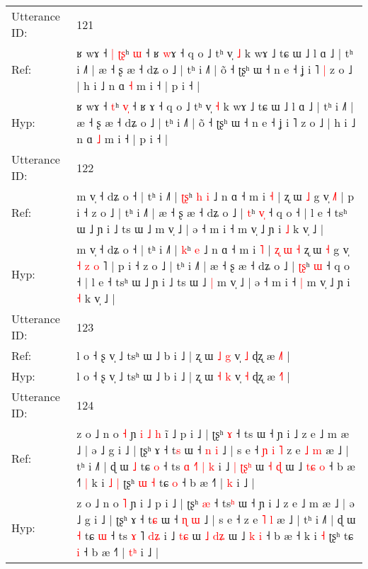\documentclass[10pt]{article}
\DeclareRobustCommand{\hl}[1]{{\textcolor{red}{#1}}}
\begin{document}
\begin{longtable}{ll}
 \\
\midrule
Utterance ID: & 121 \\
Ref: & ʁ wɤ ˧\hl{ }\hl{|} \hl{ʈ}\hl{ʂ}ʰ \hl{}\hl{ɯ} ˧ ʁ \hl{w}ɤ ˧ q o ˩ tʰ v̩ \hl{˩} k wɤ ˩ tɕ ɯ ˩ l ɑ ˩ | tʰ i ˩˥ | æ ˧ ʂ æ ˧ dʑ o ˩ | tʰ i ˩˥ | õ ˧ ʈʂʰ ɯ ˧ n e ˧ ʝ i ˥\hl{ }\hl{|} z o ˩ | h i ˩ n ɑ \hl{˧} m i ˧ | p i ˧ |
 \\
Hyp: & ʁ wɤ ˧\hl{}\hl{} \hl{}\hl{t}ʰ \hl{v}\hl{̩} ˧ ʁ \hl{}ɤ ˧ q o ˩ tʰ v̩ \hl{˧} k wɤ ˩ tɕ ɯ ˩ l ɑ ˩ | tʰ i ˩˥ | æ ˧ ʂ æ ˧ dʑ o ˩ | tʰ i ˩˥ | õ ˧ ʈʂʰ ɯ ˧ n e ˧ ʝ i ˥\hl{}\hl{} z o ˩ | h i ˩ n ɑ \hl{˩} m i ˧ | p i ˧ |
 \\
\midrule
Utterance ID: & 122 \\
Ref: & m v̩ ˧ dʑ o ˧ | tʰ i ˩˥ | \hl{ʈ}\hl{ʂ}ʰ\hl{ }\hl{h} \hl{i} ˩ n ɑ ˧ m i \hl{˧} |\hl{}\hl{}\hl{}\hl{}\hl{}\hl{} ʐ ɯ \hl{˩} g v̩\hl{}\hl{}\hl{}\hl{} \hl{}\hl{˩}˥ | p i ˧ z o ˩ | tʰ i ˩˥ | æ ˧ ʂ æ ˧ dʑ o ˩ | \hl{}\hl{t}ʰ \hl{v}\hl{̩} ˧ q o ˧ | l e ˧ tsʰ ɯ ˩ ɲ i ˩ ts ɯ ˩\hl{}\hl{} m v̩ ˩ | ə ˧ m i ˧\hl{}\hl{} m v̩ ˩ ɲ i \hl{˩} k v̩ ˩ |
 \\
Hyp: & m v̩ ˧ dʑ o ˧ | tʰ i ˩˥ | \hl{}\hl{k}ʰ\hl{}\hl{} \hl{e} ˩ n ɑ ˧ m i \hl{˥} |\hl{ }\hl{ʐ}\hl{ }\hl{ɯ}\hl{ }\hl{˧} ʐ ɯ \hl{˧} g v̩\hl{ }\hl{˧}\hl{ }\hl{z} \hl{o}\hl{ }˥ | p i ˧ z o ˩ | tʰ i ˩˥ | æ ˧ ʂ æ ˧ dʑ o ˩ | \hl{ʈ}\hl{ʂ}ʰ \hl{}\hl{ɯ} ˧ q o ˧ | l e ˧ tsʰ ɯ ˩ ɲ i ˩ ts ɯ ˩\hl{ }\hl{|} m v̩ ˩ | ə ˧ m i ˧\hl{ }\hl{|} m v̩ ˩ ɲ i \hl{˧} k v̩ ˩ |
 \\
\midrule
Utterance ID: & 123 \\
Ref: & l o ˧ ʂ v̩ ˩ tsʰ ɯ ˩ b i ˩ | ʐ ɯ \hl{˩} \hl{g} v̩ \hl{˩} ɖʐ æ \hl{˩}˥ |
 \\
Hyp: & l o ˧ ʂ v̩ ˩ tsʰ ɯ ˩ b i ˩ | ʐ ɯ \hl{˧} \hl{k} v̩ \hl{˧} ɖʐ æ \hl{˧}˥ |
 \\
\midrule
Utterance ID: & 124 \\
Ref: & z o ˩ n o \hl{˧} ɲ\hl{ }\hl{i}\hl{ }\hl{˩}\hl{ }\hl{h} i\hl{̃} ˩ p i ˩ | ʈʂʰ \hl{ɤ} ˧ ts\hl{} ɯ ˧ ɲ i ˩ z e ˩ m æ ˩ | ə ˩ g i ˩ | ʈʂʰ ɤ ˧ t\hl{s} ɯ ˧ \hl{n} \hl{i} ˩ | s e ˧\hl{ }\hl{ɲ}\hl{ }\hl{i}\hl{ }\hl{˥} z e \hl{˩} \hl{m} æ ˩ | tʰ i ˩˥ | ɖ ɯ \hl{˩} tɕ \hl{o} ˧ ts \hl{ɑ} \hl{˧}˥ \hl{|}\hl{ }\hl{k} i ˩\hl{ }\hl{|} \hl{ʈ}\hl{ʂ}\hl{ʰ} ɯ \hl{˧} \hl{}\hl{ɖ} ɯ ˩ \hl{t}\hl{ɕ} \hl{o} ˧ b æ ˧\hl{˥}\hl{ }\hl{|} k i\hl{ }\hl{˩} \hl{|} ʈʂʰ\hl{ }\hl{ɯ}\hl{ }\hl{˧} tɕ \hl{o} ˧ b æ ˧˥ | \hl{}\hl{k} i ˩ |
 \\
Hyp: & z o ˩ n o \hl{˥} ɲ\hl{}\hl{}\hl{}\hl{}\hl{}\hl{} i\hl{} ˩ p i ˩ | ʈʂʰ \hl{æ} ˧ ts\hl{ʰ} ɯ ˧ ɲ i ˩ z e ˩ m æ ˩ | ə ˩ g i ˩ | ʈʂʰ ɤ ˧ t\hl{ɕ} ɯ ˧ \hl{ɳ} \hl{ɯ} ˩ | s e ˧\hl{}\hl{}\hl{}\hl{}\hl{}\hl{} z e \hl{˥} \hl{l} æ ˩ | tʰ i ˩˥ | ɖ ɯ \hl{˧} tɕ \hl{ɯ} ˧ ts \hl{ɤ} \hl{}˥ \hl{}\hl{d}\hl{ʑ} i ˩\hl{}\hl{} \hl{}\hl{t}\hl{ɕ} ɯ \hl{˩} \hl{d}\hl{ʑ} ɯ ˩ \hl{}\hl{k} \hl{i} ˧ b æ ˧\hl{}\hl{}\hl{} k i\hl{}\hl{} \hl{˧} ʈʂʰ\hl{}\hl{}\hl{}\hl{} tɕ \hl{i} ˧ b æ ˧˥ | \hl{t}\hl{ʰ} i ˩ |

\end{longtable}
\end{document}
